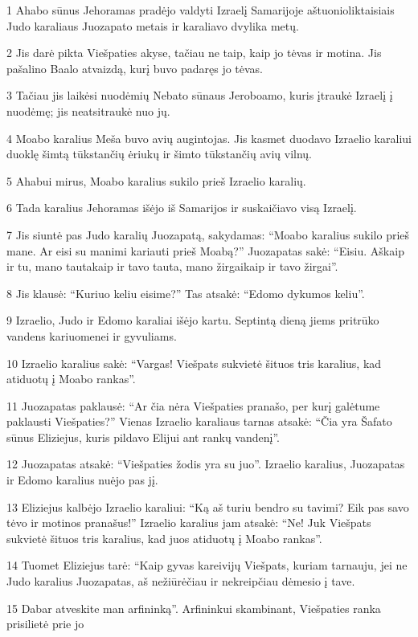 \par 1 Ahabo sūnus Jehoramas pradėjo valdyti Izraelį Samarijoje aštuonioliktaisiais Judo karaliaus Juozapato metais ir karaliavo dvylika metų. 
\par 2 Jis darė pikta Viešpaties akyse, tačiau ne taip, kaip jo tėvas ir motina. Jis pašalino Baalo atvaizdą, kurį buvo padaręs jo tėvas. 
\par 3 Tačiau jis laikėsi nuodėmių Nebato sūnaus Jeroboamo, kuris įtraukė Izraelį į nuodėmę; jis neatsitraukė nuo jų. 
\par 4 Moabo karalius Meša buvo avių augintojas. Jis kasmet duodavo Izraelio karaliui duoklę šimtą tūkstančių ėriukų ir šimto tūkstančių avių vilnų. 
\par 5 Ahabui mirus, Moabo karalius sukilo prieš Izraelio karalių. 
\par 6 Tada karalius Jehoramas išėjo iš Samarijos ir suskaičiavo visą Izraelį. 
\par 7 Jis siuntė pas Judo karalių Juozapatą, sakydamas: “Moabo karalius sukilo prieš mane. Ar eisi su manimi kariauti prieš Moabą?” Juozapatas sakė: “Eisiu. Aš­kaip ir tu, mano tauta­kaip ir tavo tauta, mano žirgai­kaip ir tavo žirgai”. 
\par 8 Jis klausė: “Kuriuo keliu eisime?” Tas atsakė: “Edomo dykumos keliu”. 
\par 9 Izraelio, Judo ir Edomo karaliai išėjo kartu. Septintą dieną jiems pritrūko vandens kariuomenei ir gyvuliams. 
\par 10 Izraelio karalius sakė: “Vargas! Viešpats sukvietė šituos tris karalius, kad atiduotų į Moabo rankas”. 
\par 11 Juozapatas paklausė: “Ar čia nėra Viešpaties pranašo, per kurį galėtume paklausti Viešpaties?” Vienas Izraelio karaliaus tarnas atsakė: “Čia yra Šafato sūnus Eliziejus, kuris pildavo Elijui ant rankų vandenį”. 
\par 12 Juozapatas atsakė: “Viešpaties žodis yra su juo”. Izraelio karalius, Juozapatas ir Edomo karalius nuėjo pas jį. 
\par 13 Eliziejus kalbėjo Izraelio karaliui: “Ką aš turiu bendro su tavimi? Eik pas savo tėvo ir motinos pranašus!” Izraelio karalius jam atsakė: “Ne! Juk Viešpats sukvietė šituos tris karalius, kad juos atiduotų į Moabo rankas”. 
\par 14 Tuomet Eliziejus tarė: “Kaip gyvas kareivijų Viešpats, kuriam tarnauju, jei ne Judo karalius Juozapatas, aš nežiūrėčiau ir nekreipčiau dėmesio į tave. 
\par 15 Dabar atveskite man arfininką”. Arfininkui skambinant, Viešpaties ranka prisilietė prie jo 
